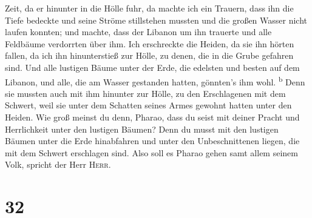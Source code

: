 Zeit, da er hinunter in die Hölle fuhr, da machte ich ein Trauern, dass
ihn die Tiefe bedeckte und seine Ströme stillstehen mussten und die
großen Wasser nicht laufen konnten; und machte, dass der Libanon um ihn
trauerte und alle Feldbäume verdorrten über ihm.  Ich
erschreckte die Heiden, da sie ihn hörten fallen, da ich ihn
hinunterstieß zur Hölle, zu denen, die in die Grube gefahren sind. Und
alle lustigen Bäume unter der Erde, die edelsten und besten auf dem
Libanon, und alle, die am Wasser gestanden hatten, gönnten's ihm wohl.
\textsuperscript{b}  Denn sie mussten auch mit ihm
hinunter zur Hölle, zu den Erschlagenen mit dem Schwert, weil sie unter
dem Schatten seines Armes gewohnt hatten unter den Heiden.
 Wie groß meinst du denn, Pharao, dass du seist mit
deiner Pracht und Herrlichkeit unter den lustigen Bäumen? Denn du musst
mit den lustigen Bäumen unter die Erde hinabfahren und unter den
Unbeschnittenen liegen, die mit dem Schwert erschlagen sind. Also soll
es Pharao gehen samt allem seinem Volk, spricht der Herr \textsc{Herr}.

\hypertarget{section-31}{%
\section{32}\label{section-31}}

